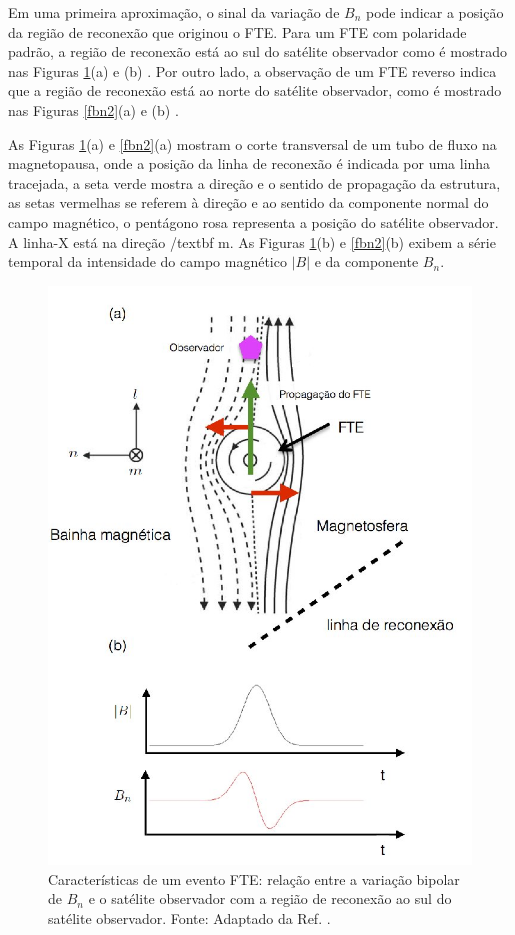 Em uma primeira aproximação, o sinal da variação de $B_{n}$ pode indicar a posição da região de reconexão que originou o FTE. Para um FTE com polaridade padrão, a região 
de reconexão está ao sul do satélite observador como é mostrado nas Figuras \ref{fbn1}(a) e (b) \cite{paschmann1982}. Por outro lado, a observação de um FTE reverso 
indica que a região de reconexão está ao norte do satélite observador, como é mostrado nas Figuras \ref{fbn2}(a) e (b) \cite{paschmann1982}. 

As Figuras \ref{fbn1}(a) e \ref{fbn2}(a) mostram o corte transversal de um tubo de fluxo na magnetopausa, onde a posição da linha de reconexão é indicada por uma linha
tracejada, a seta verde mostra a direção e o sentido de propagação da estrutura, as setas vermelhas se referem à direção e ao sentido da componente normal do campo magnético,
o pentágono rosa representa a posição do satélite observador. A linha-X está na direção {/textbf m}. As Figuras \ref{fbn1}(b) e \ref{fbn2}(b) exibem a série temporal da intensidade do campo magnético $\left|B\right|$ e da componente $B_{n}$.

\begin{figure}
	\begin{center}
		\includegraphics[scale=0.27]{fbn_fte_1.jpg}
		\caption{Características de um evento FTE: relação entre a variação bipolar de $B_{n}$ e o satélite observador com a região 
			de reconexão ao sul do satélite observador. Fonte: Adaptado da Ref. \cite{paschmann1982}.}
		\label{fbn1}
	\end{center}
\end{figure}

